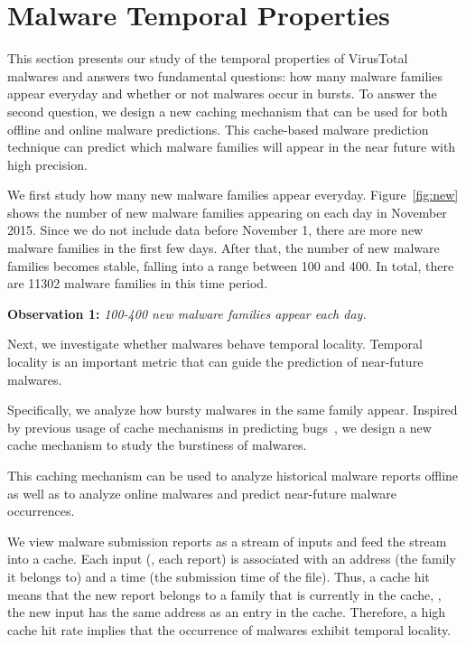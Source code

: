 \section{Malware Temporal Properties}
\label{sec:temporal}

This section presents our study of the temporal properties of VirusTotal malwares
and answers two fundamental questions: 
how many malware families appear everyday 
and whether or not malwares occur in bursts.
To answer the second question, we design a new caching mechanism 
that can be used for both offline and online malware predictions.
This cache-based malware prediction technique can predict which malware families will appear in the near 
future with high precision. 



We first study how many new malware families appear everyday. 
Figure~\ref{fig:new} shows the number of new malware families appearing on each day in November 2015. 
Since we do not include data before November 1, 
there are more new malware families in the first few days.
After that, the number of new malware families becomes stable, 
falling into a range between 100 and 400. 
In total, there are 11302 malware families in this time period. 

{\bf Observation 1:} 
{\em 100-400 new malware families appear each day.}




Next, we investigate whether malwares behave temporal locality.
Temporal locality is an important metric that can guide the 
prediction of near-future malwares.

Specifically, we analyze how bursty malwares in the same family appear.  
Inspired by previous usage of cache mechanisms in predicting bugs~\cite{predicting},
we design a new cache mechanism to study the burstiness of malwares.

This caching mechanism can be used to analyze historical malware reports offline 
as well as to analyze online malwares and predict near-future malware occurrences.

We view malware submission reports as a stream of inputs 
and feed the stream into a cache. 
Each input (\ie, each report) is associated with an address (the family it belongs to) and a time (the submission time of the file).
Thus, a cache hit means that the new report belongs to a family that is currently in the cache,
\ie, the new input has the same address as an entry in the cache.
Therefore, a high cache hit rate implies that the occurrence of malwares exhibit temporal locality.

